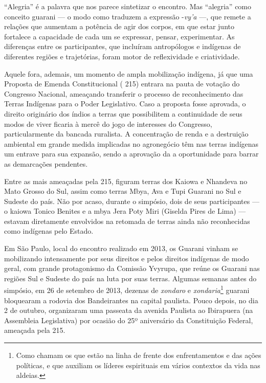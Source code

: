 ``Alegria'' é a palavra que nos parece sintetizar o encontro. Mas ``alegria''
como conceito guarani --- o modo como traduzem a expressão -\emph{vy’a} ---, que
remete a relações que aumentam a potência de agir dos corpos, em que
estar junto fortalece a capacidade de cada um se expressar, pensar,
experimentar. As diferenças entre os participantes, que incluíram
antropólogos e indígenas de diferentes regiões e trajetórias, foram
motor de reflexividade e criatividade.

Aquele fora, ademais, um momento de ampla mobilização indígena, já que
uma Proposta de Emenda Constitucional ( 215) entrara na pauta de
votação do Congresso Nacional, ameaçando transferir o processo de
reconhecimento das Terras Indígenas para o Poder Legislativo. Caso a
proposta fosse aprovada, o direito originário dos índios a terras que
possibilitem a continuidade de seus modos de viver ficaria à mercê do
jogo de interesses do Congresso, particularmente da bancada ruralista.
A concentração de renda e a destruição ambiental em grande medida
implicadas no agronegócio têm nas terras indígenas um entrave para sua
expansão, sendo a aprovação da  a oportunidade para barrar as
demarcações pendentes.

Entre as mais ameaçadas pela  215, figuram terras dos Kaiowa e
Nhandeva no Mato Grosso do Sul, assim como terras Mbya, Ava e Tupi
Guarani no Sul e Sudeste do país. Não por acaso, durante o simpósio,
dois de seus participantes --- o kaiowa Tonico Benites e a mbya Jera Poty
Miri (Giselda Pires de Lima) --- estavam diretamente envolvidos na
retomada de terras ainda não reconhecidas como indígenas pelo Estado. 

Em São Paulo, local do encontro realizado em 2013, os Guarani vinham se
mobilizando intensamente por seus direitos e pelos direitos indígenas
de modo geral, com grande protagonismo da Comissão Yvyrupa, que reúne
os Guarani nas regiões Sul e Sudeste do país na luta por suas terras.
Algumas semanas antes do simpósio, em 26 de setembro de 2013, dezenas
de \emph{xondaro} e \emph{xondaria}\footnote{Como chamam os que estão na linha de
frente dos enfrentamentos e das ações políticas, e que auxiliam os
líderes espirituais em vários contextos da vida nas aldeias.} guarani
bloquearam a rodovia dos Bandeirantes na capital paulista. Pouco
depois, no dia 2 de outubro, organizaram uma passeata da avenida
Paulista ao Ibirapuera (na Assembleia Legislativa) por ocasião do 25º
aniversário da Constituição Federal, ameaçada pela  215. 

